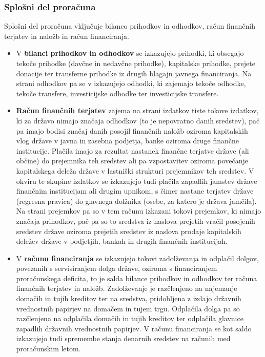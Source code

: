 \documentclass[12pt, a4paper]{article}
\begin{document}
\subsubsection[Splošno del proračuna]{Splošni del proračuna}
Splošni del proračuna vključuje bilanco prihodkov in odhodkov, račun finančnih terjatev in naložb in račun financiranja.
\begin{itemize}
\item V \textbf{bilanci prihodkov in odhodkov} se izkazujejo prihodki, ki obsegajo tekoče prihodke (davčne in nedavčne prihodke), kapitalske prihodke, prejete donacije ter transferne prihodke iz drugih blagajn javnega financiranja. Na strani odhodkov pa se v izkazujejo odhodki, ki zajemajo tekoče odhodke, tekoče transfere, investicijske odhodke ter investicijske transfere.

\item \textbf{Račun finančnih terjatev} zajema na strani izdatkov tiste tokove izdatkov, ki za državo nimajo značaja odhodkov (to je nepovratno danih sredstev), pač pa imajo bodisi značaj danih posojil finančnih naložb oziroma kapitalskih vlog države v javna in zasebna podjetja, banke oziroma druge finančne institucije. Plačila imajo za rezultat nastanek finančne terjatve države (ali občine) do prejemnika teh sredstev ali pa vzpostavitev oziroma povečanje kapitalskega deleža države v lastniški strukturi prejemnikov teh sredstev. V okviru te skupine izdatkov se izkazujejo tudi plačila zapadlih jamstev države finančnim institucijam ali drugim upnikom, s čimer nastane terjatev države (regresna pravica) do glavnega dolžnika (osebe, za katero je država jamčila). Na strani prejemkov pa so v tem računu izkazani tokovi prejemkov, ki nimajo značaja prihodkov, pač pa so to sredstva iz naslova prejetih vračil posojenih sredstev države oziroma prejetih sredstev iz naslova prodaje kapitalskih deležev države v podjetjih, bankah in drugih finančnih institucijah.

\item V \textbf{računu financiranja} se izkazujejo tokovi zadolževanja in odplačil dolgov, povezanih s servisiranjem dolga države, oziroma s financiranjem proračunskega deficita, to je salda bilance prihodkov in odhodkov ter računa finančnih terjatev in naložb. Zadolževanje je razčlenjeno na najemanje domačih in tujih kreditov ter na sredstva, pridobljena z izdajo državnih vrednostnih papirjev na domačem in tujem trgu. Odplačila dolga pa so razčlenjena na odplačila domačih in tujih kreditov ter odplačila glavnice zapadlih državnih vrednostnih papirjev. V računu financiranja se kot saldo izkazujejo tudi spremembe stanja denarnih sredstev na računih med proračunskim letom.
\end{itemize}
\end{document}
